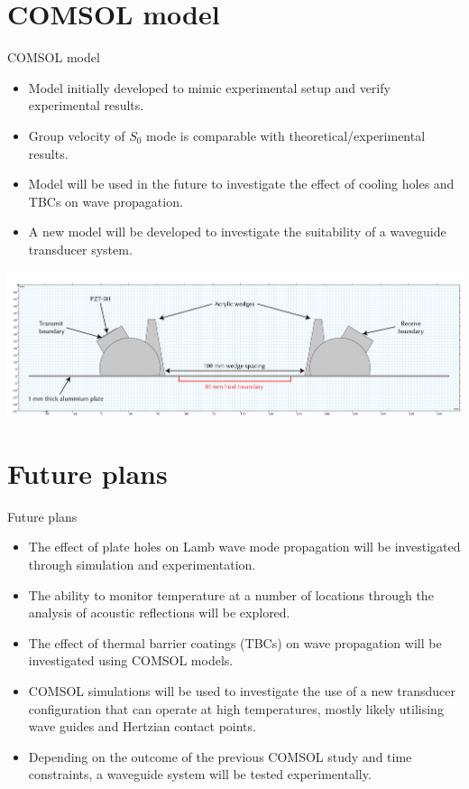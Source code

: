 \documentclass[aspectratio=169, 9pt]{beamer}
\begin{document}
\section{COMSOL model}
\begin{frame}{COMSOL model}

\begin{itemize}
    \item Model initially developed to mimic experimental setup and verify experimental results.
    \item Group velocity of $S_0$ mode is comparable with theoretical/experimental results.
    \item Model will be used in the future to investigate the effect of cooling holes and TBCs on wave propagation. 
    \item A new model will be developed to investigate the suitability of a waveguide transducer system.  
\end{itemize}

\begin{center}
  \includegraphics[width=\textwidth]{images/comsoldiagram.png}
 \end{center}

\end{frame}


\section{Future plans}
\begin{frame}{Future plans}
  \begin{itemize}
    \item The effect of plate holes on Lamb wave mode propagation will be investigated through simulation and experimentation.
    \item The ability to monitor temperature at a number of locations through the analysis of acoustic reflections will be explored.
    \item The effect of thermal barrier coatings (TBCs) on wave propagation will be investigated using COMSOL models.
    \item COMSOL simulations will be used to investigate the use of a new transducer configuration that can operate at high temperatures, mostly likely utilising wave guides and Hertzian contact points.
    \item Depending on the outcome of the previous COMSOL study and time constraints, a waveguide system will be tested experimentally.
\end{itemize}
\end{frame}
\end{document}
